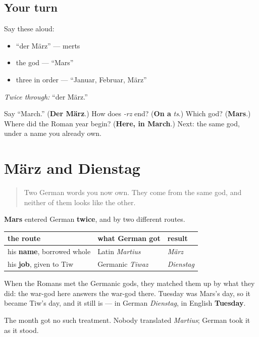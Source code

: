 \subsection*{Your turn}
Say these aloud:

\begin{itemize}
\raggedright
  \item \textquotedblleft{}der März\textquotedblright{} — merts
  \item the god — \textquotedblleft{}Mars\textquotedblright{}
  \item three in order — \textquotedblleft{}Januar, Februar, März\textquotedblright{}
\end{itemize}

\emph{Twice through:} \textquotedblleft{}der März.\textquotedblright{}

\begin{tcolorbox}[breakable,colback=teal!4,colframe=teal!35!black,title={Before you move on}]
Say \textquotedblleft{}March.\textquotedblright{} (\textbf{Der März}.) How does \emph{-rz} end? (\textbf{On a} \emph{ts}.) Which god? (\textbf{Mars}.) Where did the Roman year begin? (\textbf{Here, in March}.) Next: the same god, under a name you already own.
\end{tcolorbox}
\section[März und Dienstag]{März and Dienstag}

\label{lesson:GE-C09-maerz-mars}



\begin{quote}
Two German words you now own. They come from the same god, and neither of them looks like the other.
\end{quote}

\begin{cousinweb}
\textbf{Mars} entered German \textbf{twice}, and by two different routes.

\noindent
\begin{tabularx}{\linewidth}{@{}>{\raggedright\arraybackslash}X>{\raggedright\arraybackslash}X>{\raggedright\arraybackslash}X@{}}
\toprule
\textbf{the route} & \textbf{what German got} & \textbf{result} \\
\midrule
his \textbf{name}, borrowed whole & Latin \emph{Martius} & \emph{März} \\
his \textbf{job}, given to Tiw & Germanic \emph{Tiwaz} & \emph{Dienstag} \\
\bottomrule
\end{tabularx}

When the Romans met the Germanic gods, they matched them up by what they did: the war-god here answers the war-god there. Tuesday was Mars's day, so it became Tiw's day, and it still is — in German \emph{Dienstag}, in English \textbf{Tuesday}.

The month got no such treatment. Nobody translated \emph{Martius}; German took it as it stood.
\end{cousinweb}

